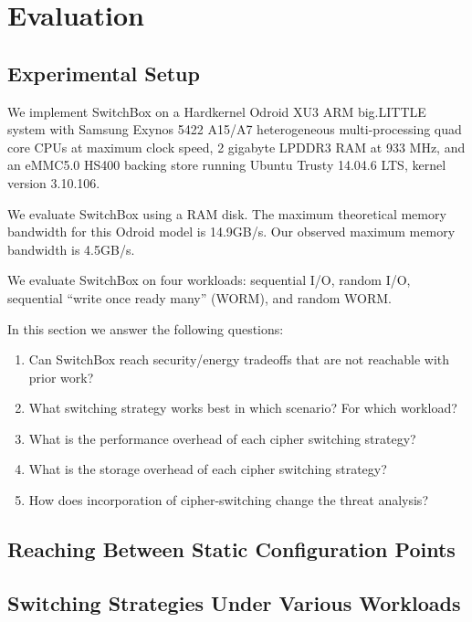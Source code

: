 \section{Evaluation}\label{sec:evaluation}

\subsection{Experimental Setup}

We implement SwitchBox on a Hardkernel Odroid XU3 ARM big.LITTLE system with
Samsung Exynos 5422 A15/A7 heterogeneous multi-processing quad core CPUs at
maximum clock speed, 2 gigabyte LPDDR3 RAM at 933 MHz, and an eMMC5.0 HS400
backing store running Ubuntu Trusty 14.04.6 LTS, kernel version 3.10.106.

We evaluate SwitchBox using a RAM disk. The maximum theoretical memory bandwidth
for this Odroid model is 14.9GB/s\@. Our observed maximum memory bandwidth is
4.5GB/s.

We evaluate SwitchBox on four workloads: sequential I/O, random I/O, sequential
``write once ready many'' (WORM), and random WORM.

In this section we answer the following questions:
\begin{enumerate}
 \item Can SwitchBox reach security/energy tradeoffs that are not reachable with prior work?
 \item What switching strategy works best in which scenario? For which workload?
 \item What is the performance overhead of each cipher switching strategy?
 \item What is the storage overhead of each cipher switching strategy?
 \item How does incorporation of cipher-switching change the threat analysis?
\end{enumerate}

\subsection{Reaching Between Static Configuration Points}


\subsection{Switching Strategies Under Various Workloads}

